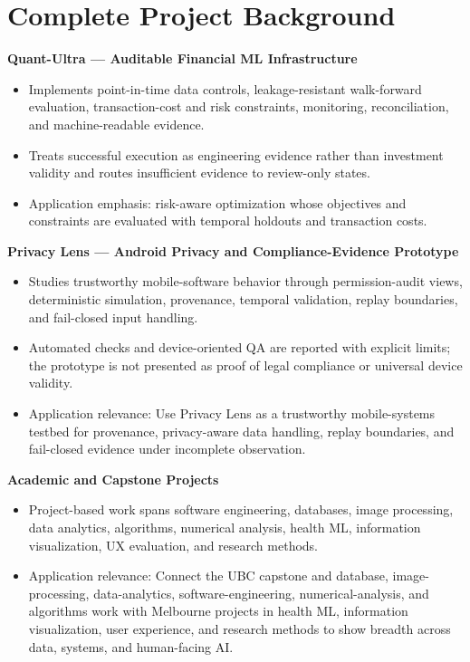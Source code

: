 \documentclass[11pt]{article}
\begin{document}
\section*{Complete Project Background}
\textbf{Quant-Ultra --- Auditable Financial ML Infrastructure}
\begin{itemize}
\item Implements point-in-time data controls, leakage-resistant walk-forward evaluation, transaction-cost and risk constraints, monitoring, reconciliation, and machine-readable evidence.
\item Treats successful execution as engineering evidence rather than investment validity and routes insufficient evidence to review-only states.
\item Application emphasis: risk-aware optimization whose objectives and constraints are evaluated with temporal holdouts and transaction costs.
\end{itemize}

\textbf{Privacy Lens --- Android Privacy and Compliance-Evidence Prototype}
\begin{itemize}
\item Studies trustworthy mobile-software behavior through permission-audit views, deterministic simulation, provenance, temporal validation, replay boundaries, and fail-closed input handling.
\item Automated checks and device-oriented QA are reported with explicit limits; the prototype is not presented as proof of legal compliance or universal device validity.
\item Application relevance: Use Privacy Lens as a trustworthy mobile-systems testbed for provenance, privacy-aware data handling, replay boundaries, and fail-closed evidence under incomplete observation.
\end{itemize}

\textbf{Academic and Capstone Projects}
\begin{itemize}
\item Project-based work spans software engineering, databases, image processing, data analytics, algorithms, numerical analysis, health ML, information visualization, UX evaluation, and research methods.
\item Application relevance: Connect the UBC capstone and database, image-processing, data-analytics, software-engineering, numerical-analysis, and algorithms work with Melbourne projects in health ML, information visualization, user experience, and research methods to show breadth across data, systems, and human-facing AI.
\end{itemize}
\end{document}
